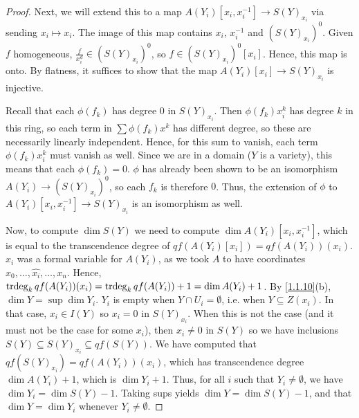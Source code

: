 \begin{proof}
    Next, we will extend this to a map $A(Y_i)[x_i, x_i^{-1}] \longrightarrow S(Y)_{x_i}$ via sending $x_i \mapsto x_i$. The image of this map contains $x_i$, $x_i^{-1}$ and $(S(Y)_{x_i})^0$. Given $f$ homogeneous, $\frac{f}{x_i^d} \in (S(Y)_{x_i})^0$, so $f \in (S(Y)_{x_i})^0[x_i]$. Hence, this map is onto. By flatness, it suffices to show that the map $A(Y_i)[x_i] \longrightarrow S(Y)_{x_i}$ is injective.

    Recall that each $\phi(f_k)$ has degree $0$ in $S(Y)_{x_i}$. Then $\phi(f_k) x_i^k$ has degree $k$ in this ring, so each term in $\sum \phi(f_k) x^k$ has different degree, so these are necessarily linearly independent. Hence, for this sum to vanish, each term $\phi(f_k) x_i^k$ must vanish as well. Since we are in a domain ($Y$ is a variety), this means that each $\phi(f_k) = 0$. $\phi$ has already been shown to be an isomorphism $A(Y_i) \longrightarrow (S(Y)_{x_i})^0$, so each $f_k$ is therefore $0$. Thus, the extension of $\phi$ to $A(Y_i)[x_i, x_i^{-1}] \longrightarrow S(Y)_{x_i}$ is an isomorphism as well.

    Now, to compute $\dim S(Y)$ we need to compute $\dim A(Y_i)[x_i, x_i^{-1}]$, which is equal to the transcendence degree of $qf(A(Y_i)[x_i]) = qf(A(Y_i))(x_i)$. $x_i$ was a formal variable for $A(Y_i)$, as we took $A$ to have coordinates $x_0, \dots, \widehat{x_i}, \dots, x_n$. Hence, $\operatorname{tr deg}_k qf(A(Y_i))(x_i) = \operatorname{tr deg}_k qf(A(Y_i)) + 1 = \dim A(Y_i) + 1$. By \ref{1.1.10}(b), $\dim Y = \sup \dim Y_i$. $Y_i$ is empty when $Y \cap U_i = \emptyset$, i.e. when $Y \subseteq Z(x_i)$. In that case, $x_i \in I(Y)$ so $x_i = 0$ in $S(Y)_{x_i}$. When this is not the case (and it must not be the case for some $x_i$), then $x_i \neq 0$ in $S(Y)$ so we have inclusions $S(Y) \subseteq S(Y)_{x_i} \subseteq qf(S(Y))$. We have computed that $qf(S(Y)_{x_i}) = qf(A(Y_i))(x_i)$, which has transcendence degree $\dim A(Y_i) + 1$, which is $\dim Y_i + 1$. Thus, for all $i$ such that $Y_i \neq \emptyset$, we have $\dim Y_i = \dim S(Y) - 1$. Taking sups yields $\dim Y = \dim S(Y) - 1$, and that $\dim Y = \dim Y_i$ whenever $Y_i \neq \emptyset$.
\end{proof}                                                                              
